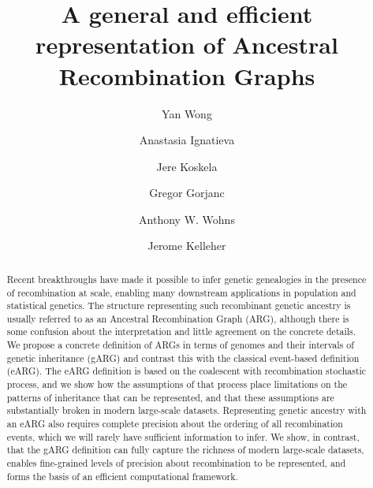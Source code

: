 \documentclass{article}
\begin{document}
\linenumbers
\title{A general and efficient representation of Ancestral Recombination Graphs}

\author[1]{Yan Wong}

\author[2,$\star$]{Anastasia Ignatieva}
\author[3,$\star$]{Jere Koskela}

\author[4]{Gregor Gorjanc}
\author[5]{Anthony W. Wohns}

\author[1,$\dagger$]{Jerome Kelleher}




\maketitle

\begin{abstract}
Recent breakthroughs have made it possible to infer genetic genealogies in
the presence of recombination at scale, enabling many
downstream applications in population and statistical genetics.
The structure representing such recombinant genetic ancestry
is usually referred to as an Ancestral Recombination Graph (ARG),
although there is some confusion about the interpretation and little
agreement on the concrete details.
We propose a concrete definition of ARGs
in terms of genomes and their intervals of genetic inheritance (gARG)
and contrast this with the classical event-based definition (eARG).
The eARG definition is based on the coalescent with recombination
stochastic process, and we show how the assumptions of that process
place limitations on the patterns of inheritance that can be
represented, and that these assumptions are
substantially broken
in modern large-scale datasets.
Representing genetic ancestry
with an eARG also requires complete precision about the ordering
of all recombination events, which we will rarely have sufficient
information to infer.
We show, in contrast, that the gARG definition
can fully capture the richness of modern large-scale datasets,
enables fine-grained
levels of precision about recombination to be represented,
and forms the basis of an efficient computational framework.
\end{abstract}
\end{document}
